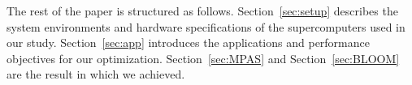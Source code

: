The rest of the paper is structured as follows. Section~\ref{sec:setup} describes the system environments and hardware specifications of the supercomputers used in our study. Section~\ref{sec:app} introduces the applications and performance objectives for our optimization. Section~\ref{sec:MPAS} and Section~\ref{sec:BLOOM} are the result in which we achieved.


